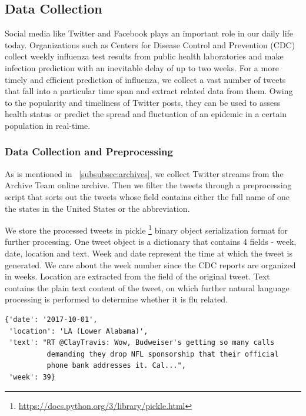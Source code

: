\documentclass[12pt, oneside]{article}
\begin{document}
\subsection{Data Collection}
\label{subsec:data_collection}


Social media like Twitter and Facebook plays an important role in our daily life today. Organizations such as Centers for Disease Control and Prevention
(CDC) collect weekly influenza test results from public health laboratories and make infection prediction with an inevitable delay of up to two weeks.
For a more timely and efficient prediction of influenza, we collect a vast number of tweets that fall into a particular time span and extract related data
from them. Owing to the popularity and timeliness of Twitter posts, they can be used to assess health status or predict the spread and fluctuation of an epidemic
in a certain population in real-time.

\subsubsection{Data Collection and Preprocessing}

As is mentioned in ~\ref{subsubsec:archives}, we collect Twitter streams from the Archive Team online archive. Then we filter the tweets through a preprocessing
script that sorts out the tweets whose  field contains either the full name of one the states in the United States or the abbreviation.

We store the processed tweets in pickle \footnote{\url{https://docs.python.org/3/library/pickle.html}} binary object serialization format for further processing.
One tweet object is a dictionary that contains 4 fields - week, date, location and text. Week and date represent the time at which the tweet is generated. We care
about the week number since the CDC reports are organized in weeks. Location are extracted from the  field of the original tweet. Text contains the
plain text content of the tweet, on which further natural language processing is performed to determine whether it is flu related.

\begin{lstlisting}[caption={A sample preprocessed tweet}]
{'date': '2017-10-01',
 'location': 'LA (Lower Alabama)',
 'text': "RT @ClayTravis: Wow, Budweiser's getting so many calls
          demanding they drop NFL sponsorship that their official
          phone bank addresses it. Cal...",
 'week': 39}
\end{lstlisting}
\end{document}
